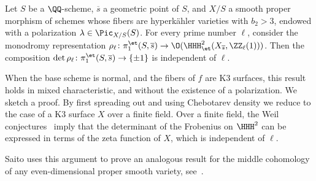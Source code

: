 \begin{corollary}
Let $S$ be a $\QQ$-scheme, $\overline{s}$ a geometric point of $S$, and $X/S$ a smooth proper morphism of schemes whose fibers are hyperk\"ahler varieties with $b_2 > 3$, endowed with a polarization $\lambda \in \Pic_{X/S}(S)$. For every prime number $\ell$, consider the monodromy representation $\rho_{\ell}\colon \pi^{\et}_1(S,\overline{s}) \rightarrow  \O(\HHH^2_{\et}(X_{\overline{s}},\ZZ_{\ell}(1)))$. Then the composition $\det \rho_{\ell}\colon \pi_1^{\et}(S,\overline{s}) \rightarrow \{\pm 1\}$ is independent of $\ell$.%
\end{corollary}

\begin{remark}\label{rk:orientations_k3}
When the base scheme is normal, and the fibers of $f$ are K3 surfaces, this result holds in mixed characteristic, and without the existence of a polarization. We sketch a proof. By first spreading out and using Chebotarev density we reduce to the case of a K3 surface $X$ over a finite field. Over a finite field, the Weil conjectures~\cite[Th\'eor\`eme~1.3]{DeligneK3} imply that the determinant of the Frobenius on $\HHH^2$ can be expressed in terms of the zeta function of $X$, which is independent of $\ell$.

Saito uses this argument to prove an analogous result for the middle cohomology of any even-dimensional proper smooth variety, see~\cite[Lemma~3.2]{Saito}.
\end{remark}

